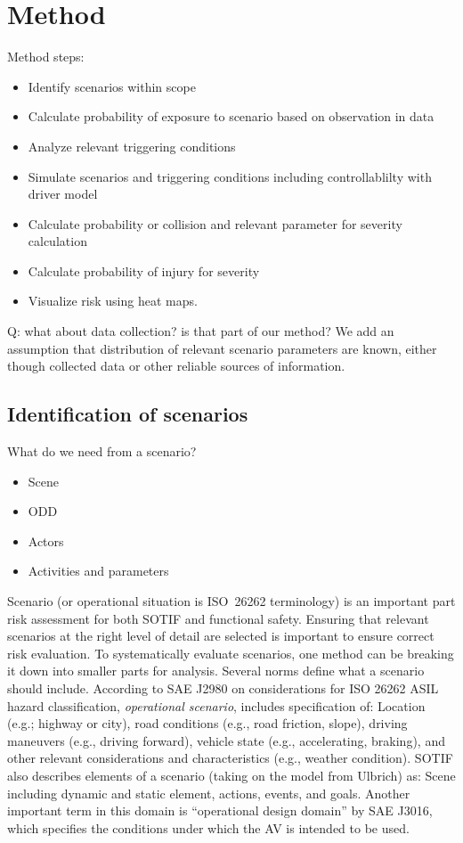 \section{Method}
\label{sec:method}

Method steps:
\begin{itemize}
    \item Identify scenarios within scope 
    \item Calculate probability of exposure to scenario based on observation in data
    \item Analyze relevant triggering conditions 
    \item Simulate scenarios and triggering conditions including controllablilty with driver model 
    \item Calculate probability or collision and relevant parameter for severity calculation 
    \item Calculate probability of injury for severity  
    \item Visualize risk using heat maps. 
\end{itemize}
Q: what about data collection? is that part of our method? 
We add an assumption that distribution of relevant scenario parameters are known, either though collected data or other reliable sources of information. 

\subsection{Identification of scenarios}

What do we need from a scenario?
\begin{itemize}
    \item Scene 
    \item ODD
    \item Actors 
    \item Activities and parameters 
\end{itemize}

Scenario (or operational situation is ISO~26262 terminology) is an important part risk assessment for both SOTIF and functional safety. 
Ensuring that relevant scenarios at the right level of detail are selected is important to ensure correct risk evaluation. 
To systematically evaluate scenarios, one method can be breaking it down into smaller parts for analysis.  
Several norms define what a scenario should include. 
According to SAE J2980 on considerations for ISO 26262 ASIL hazard classification, \textit{operational scenario}, includes specification of: Location (e.g.; highway or city), road conditions (e.g., road friction, slope), driving maneuvers (e.g., driving forward), vehicle state (e.g., accelerating, braking), and other relevant considerations and characteristics (e.g., weather condition). 
SOTIF also describes elements of a scenario (taking on the model from Ulbrich) as: Scene including dynamic and static element, actions, events, and goals. 
Another important term in this domain is ``operational design domain'' by SAE J3016, which specifies the conditions under which the AV is intended to be used.

